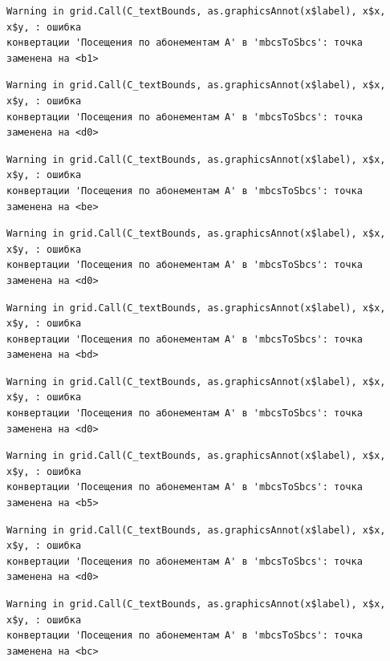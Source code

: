 \documentclass[
  letterpaper,
  DIV=11,
  numbers=noendperiod]{scrreprt}
\begin{document}
\begin{verbatim}
Warning in grid.Call(C_textBounds, as.graphicsAnnot(x$label), x$x, x$y, : ошибка
конвертации 'Посещения по абонементам А' в 'mbcsToSbcs': точка заменена на <b1>
\end{verbatim}

\begin{verbatim}
Warning in grid.Call(C_textBounds, as.graphicsAnnot(x$label), x$x, x$y, : ошибка
конвертации 'Посещения по абонементам А' в 'mbcsToSbcs': точка заменена на <d0>
\end{verbatim}

\begin{verbatim}
Warning in grid.Call(C_textBounds, as.graphicsAnnot(x$label), x$x, x$y, : ошибка
конвертации 'Посещения по абонементам А' в 'mbcsToSbcs': точка заменена на <be>
\end{verbatim}

\begin{verbatim}
Warning in grid.Call(C_textBounds, as.graphicsAnnot(x$label), x$x, x$y, : ошибка
конвертации 'Посещения по абонементам А' в 'mbcsToSbcs': точка заменена на <d0>
\end{verbatim}

\begin{verbatim}
Warning in grid.Call(C_textBounds, as.graphicsAnnot(x$label), x$x, x$y, : ошибка
конвертации 'Посещения по абонементам А' в 'mbcsToSbcs': точка заменена на <bd>
\end{verbatim}

\begin{verbatim}
Warning in grid.Call(C_textBounds, as.graphicsAnnot(x$label), x$x, x$y, : ошибка
конвертации 'Посещения по абонементам А' в 'mbcsToSbcs': точка заменена на <d0>
\end{verbatim}

\begin{verbatim}
Warning in grid.Call(C_textBounds, as.graphicsAnnot(x$label), x$x, x$y, : ошибка
конвертации 'Посещения по абонементам А' в 'mbcsToSbcs': точка заменена на <b5>
\end{verbatim}

\begin{verbatim}
Warning in grid.Call(C_textBounds, as.graphicsAnnot(x$label), x$x, x$y, : ошибка
конвертации 'Посещения по абонементам А' в 'mbcsToSbcs': точка заменена на <d0>
\end{verbatim}

\begin{verbatim}
Warning in grid.Call(C_textBounds, as.graphicsAnnot(x$label), x$x, x$y, : ошибка
конвертации 'Посещения по абонементам А' в 'mbcsToSbcs': точка заменена на <bc>
\end{verbatim}
\end{document}
